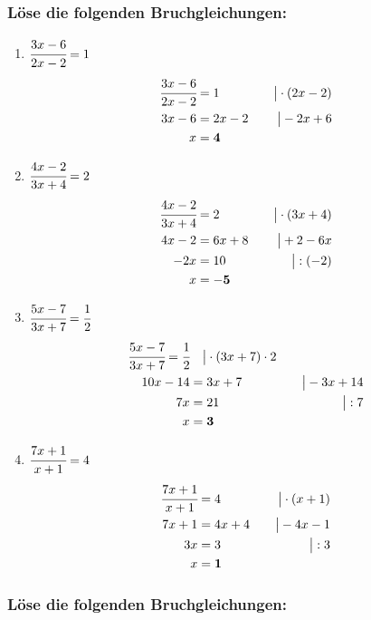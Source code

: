 \documentclass[a4paper,10pt]{article} %
\begin{document}
\subsubsection{Löse die folgenden Bruchgleichungen:}

\begin{enumerate}[label=\alph*)]

  \item \(\cfrac{3x - 6}{2x - 2} = 1\)
  \[
    \begin{aligned}
      \cfrac{3x - 6}{2x - 2} &= 1 &\quad\big| \cdot (2x - 2) \\
      3x - 6 &= 2x - 2 &\quad\big| - 2x + 6 \\
      x &= \mathbf{4}
    \end{aligned}
  \]

  \item \(\cfrac{4x - 2}{3x + 4} = 2\)
  \[
    \begin{aligned}
      \cfrac{4x - 2}{3x + 4} &= 2 &\quad\big| \cdot (3x + 4) \\
      4x - 2 &= 6x + 8 &\quad\big| + 2 - 6x \\
      -2x &= 10 &\quad\big| : (-2) \\
      x &= \mathbf{-5}
    \end{aligned}
  \]

  \item \(\cfrac{5x - 7}{3x + 7} = \cfrac{1}{2}\)
  \[
    \begin{aligned}
      \cfrac{5x - 7}{3x + 7} = \cfrac{1}{2} &\quad\big| \cdot (3x + 7) \cdot 2 \\
      10x - 14 &= 3x + 7 &\quad\big| - 3x + 14 \\
      7x &= 21 &\quad\big| : 7 \\
      x &= \mathbf{3}
    \end{aligned}
  \]

  \item \(\cfrac{7x + 1}{x + 1} = 4\)
  \[
    \begin{aligned}
      \cfrac{7x + 1}{x + 1} &= 4 &\quad\big| \cdot (x + 1) \\
      7x + 1 &= 4x + 4 &\quad\big| - 4x - 1 \\
      3x &= 3 &\quad\big| : 3 \\
      x &= \mathbf{1}
    \end{aligned}
  \]

\end{enumerate}

\subsubsection{Löse die folgenden Bruchgleichungen:}
\end{document}
